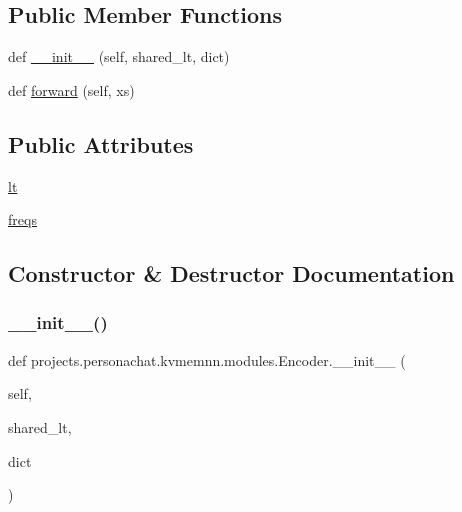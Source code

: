 \subsection*{Public Member Functions}
\begin{DoxyCompactItemize}
\item 
def \hyperlink{classprojects_1_1personachat_1_1kvmemnn_1_1modules_1_1Encoder_a9ec8df457392023bb1d823f204ca645f}{\+\_\+\+\_\+init\+\_\+\+\_\+} (self, shared\+\_\+lt, dict)
\item 
def \hyperlink{classprojects_1_1personachat_1_1kvmemnn_1_1modules_1_1Encoder_a06627a5af4545ab9baad60440ad4e9bb}{forward} (self, xs)
\end{DoxyCompactItemize}
\subsection*{Public Attributes}
\begin{DoxyCompactItemize}
\item 
\hyperlink{classprojects_1_1personachat_1_1kvmemnn_1_1modules_1_1Encoder_aaeceefba978096fa670e5b2b598a2d1c}{lt}
\item 
\hyperlink{classprojects_1_1personachat_1_1kvmemnn_1_1modules_1_1Encoder_ae221f1c7a7a3d2b946b4d9961259a6d3}{freqs}
\end{DoxyCompactItemize}


\subsection{Constructor \& Destructor Documentation}
\mbox{\label{classprojects_1_1personachat_1_1kvmemnn_1_1modules_1_1Encoder_a9ec8df457392023bb1d823f204ca645f}} 
\subsubsection{\texorpdfstring{\+\_\+\+\_\+init\+\_\+\+\_\+()}{\_\_init\_\_()}}
{\footnotesize\ttfamily def projects.\+personachat.\+kvmemnn.\+modules.\+Encoder.\+\_\+\+\_\+init\+\_\+\+\_\+ (\begin{DoxyParamCaption}\item[{}]{self,  }\item[{}]{shared\+\_\+lt,  }\item[{}]{dict }\end{DoxyParamCaption})}




